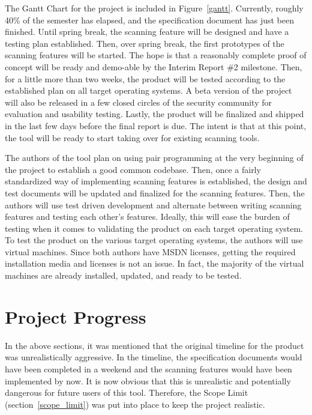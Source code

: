 \documentclass[letterpaper,12pt]{article}
\begin{document}
The Gantt Chart for the project is included in Figure~\ref{gantt}.  Currently,
roughly 40\% of the semester has elapsed, and the specification document has
just been finished.  Until spring break, the scanning feature will be designed
and have a testing plan established.  Then, over spring break, the first
prototypes of the scanning features will be started.  The hope is that a
reasonably complete proof of concept will be ready and demo-able by the Interim
Report \#2 milestone.  Then, for a little more than two weeks, the product will
be tested according to the established plan on all target operating systems.  A
beta version of the project will also be released in a few closed circles of the
security community for evaluation and usability testing.  Lastly, the product
will be finalized and shipped in the last few days before the final report is
due.  The intent is that at this point, the tool will be ready to start taking
over for existing scanning tools.  

The authors of the tool plan on using pair programming at the very beginning of
the project to establish a good common codebase.  Then, once a fairly
standardized way of implementing scanning features is established, the design
and test documents will be updated and finalized for the scanning features. 
Then, the authors will use test driven development and alternate between writing
scanning features and testing each other's features.  Ideally, this will ease
the burden of testing when it comes to validating the product on each target
operating system.  To test the product on the various target operating systems,
the authors will use virtual machines.  Since both authors have MSDN licenses,
getting the required installation media and licenses is not an issue.  In fact,
the majority of the virtual machines are already installed, updated, and ready
to be tested.  

\newpage



\section{Project Progress} \label{project_progress}
In the above sections, it was mentioned that the original timeline for the
product was unrealistically aggressive.  In the timeline, the specification
documents would have been completed in a weekend and the scanning features would
have been implemented by now.  It is now obvious that this is unrealistic and
potentially dangerous for future users of this tool.  Therefore, the Scope Limit
(section~\ref{scope_limit}) was put into place to keep the project realistic.  
\end{document}
